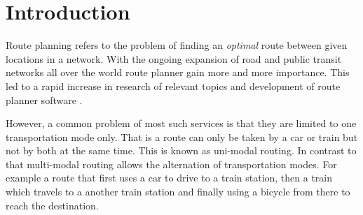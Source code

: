 \section{Introduction}\label{introduction}
	Route planning refers to the problem of finding an \textit{optimal} route between given locations in a network.
	With the ongoing expansion of road and public transit networks all over the world route planner gain more and
	more importance. This led to a rapid increase in research 
	of relevant topics and development of route planner software .
	
	However, a common problem of most such services is that they are limited to one transportation mode only.
	That is a route can only be taken by a car or train but not by both at the same time. This is known as uni-modal routing.
	In contrast to that multi-modal routing allows the alternation of transportation modes. For example a route that
	first uses a car to drive to a train station, then a train which travels to a another train station and finally
	using a bicycle from there to reach the destination.
	

